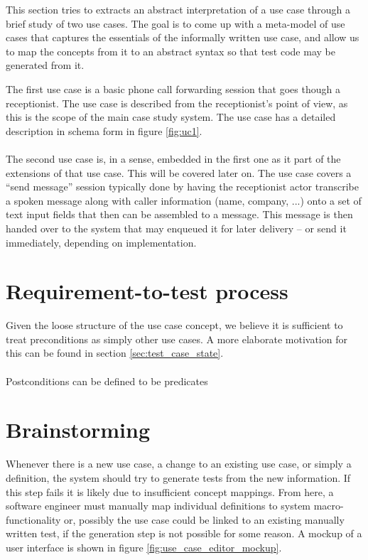 This section tries to extracts an abstract interpretation of a use case through a brief study of two use cases. The goal is to come up with a meta-model of use cases that captures the essentials of the informally written use case, and allow us to map the concepts from it to an abstract syntax so that test code may be generated from it.

The first use case is a basic phone call forwarding session that goes though a receptionist. The use case is described from the receptionist's point of view, as this is the scope of the main case study system. The use case has a detailed description in schema form in figure \ref{fig:uc1}. \\\\
The second use case is, in a sense, embedded in the first one as it part of the extensions of that use case. This will be covered later on. The use case covers a ``send message'' session typically done by having the receptionist actor transcribe a spoken message along with caller information (name, company, ...) onto a set of text input fields that then can be assembled to a message. This message is then handed over to the system that may enqueued it for later delivery -- or send it immediately, depending on implementation.


\section{Requirement-to-test process}
Given the loose structure of the use case concept, we believe it is sufficient to treat preconditions as simply other use cases. A more elaborate motivation for this can be found in section \ref{sec:test_case_state}.\\\\
Postconditions can be defined to be predicates

\section{Brainstorming}
Whenever there is a new use case, a change to an existing use case, or simply a definition, the system should try to generate tests from the new information. If this step fails it is likely due to insufficient concept mappings. From here, a software engineer must manually map individual definitions to system macro-functionality or, possibly the use case could be linked to an existing manually written test, if the generation step is not possible for some reason. A mockup of a user interface is shown in figure \ref{fig:use_case_editor_mockup}.

